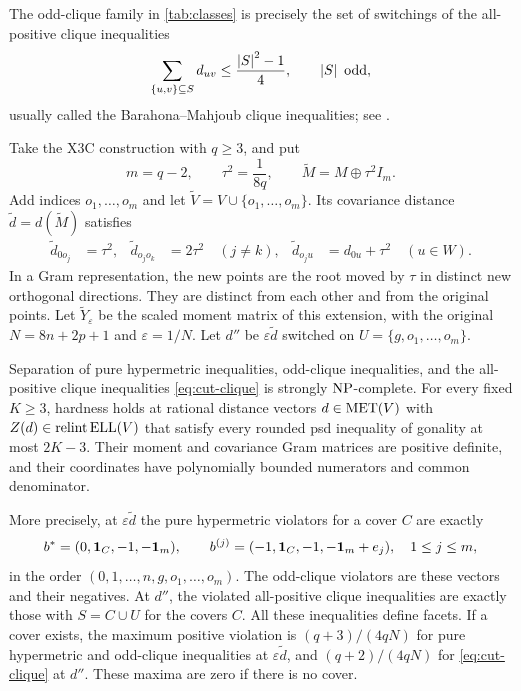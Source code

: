 The odd-clique family in \cref{tab:classes} is precisely the set of
switchings of the all-positive clique inequalities
\begin{equation}\label{eq:cut-clique}
 \sum_{\{u,v\}\subseteq S}d_{uv}\leq\frac{\left\lvert S\right\rvert^2-1}{4},
 \qquad \left\lvert S\right\rvert\text{ odd},
\end{equation}
usually called the Barahona--Mahjoub clique inequalities; see
\citet{BarahonaMahjoub1986,Letchford2022,GKL2012}.

Take the X3C construction with $q\geq3$, and put
\[
 m=q-2,\qquad \tau^2=\frac1{8q},\qquad
 \widetilde M=M\oplus\tau^2 I_m.
\]
Add indices $o_1,\ldots,o_m$ and let
$\widetilde V=V\cup\{o_1,\ldots,o_m\}$.
Its covariance distance $\widetilde d=d(\widetilde M)$ satisfies
\begin{align*}
 \widetilde d_{0o_j}&=\tau^2,&
 \widetilde d_{o_jo_k}&=2\tau^2\quad(j\ne k),&
 \widetilde d_{o_ju}&=d_{0u}+\tau^2\quad(u\in W).
\end{align*}
In a Gram representation, the new points are the root moved by $\tau$
in distinct new orthogonal directions. They are distinct from each other
and from the original points.
Let $\widetilde Y_\varepsilon$ be the scaled moment matrix of this
extension, with the original $N=8n+2p+1$ and $\varepsilon=1/N$.
Let $d''$ be $\varepsilon\widetilde d$ switched on
$U=\{g,o_1,\ldots,o_m\}$.

\begin{theorem}\label{thm:pure-clique-hardness}
Separation of pure hypermetric inequalities, odd-clique inequalities,
and the all-positive clique inequalities \eqref{eq:cut-clique} is strongly
$\mathrm{NP}$-complete.
For every fixed $K\geq3$, hardness holds at rational distance vectors
$d\in\operatorname{MET}(V)$ with $Z(d)\in\operatorname{relint}\operatorname{ELL}(V)$ that satisfy every rounded psd
inequality of gonality at most $2K-3$. Their moment and covariance
Gram matrices are positive definite, and their coordinates have
polynomially bounded numerators and common denominator.

More precisely, at $\varepsilon\widetilde d$ the pure hypermetric
violators for a cover $C$ are exactly
\begin{equation}\label{eq:pure-violators}
 b^*=(0,\mathbf 1_C,-1,-\mathbf 1_m),\qquad
 b^{(j)}=(-1,\mathbf 1_C,-1,-\mathbf 1_m+e_j),\quad 1\leq j\leq m,
\end{equation}
in the order $(0,1,\ldots,n,g,o_1,\ldots,o_m)$.
The odd-clique violators are these vectors and their negatives.
At $d''$, the violated all-positive clique inequalities are exactly
those with $S=C\cup U$ for the covers $C$.
All these inequalities define facets.
If a cover exists, the maximum positive violation is
$(q+3)/(4qN)$ for pure hypermetric and odd-clique inequalities at
$\varepsilon\widetilde d$, and $(q+2)/(4qN)$ for
\eqref{eq:cut-clique} at $d''$. These maxima are zero if there is no cover.
\end{theorem}

